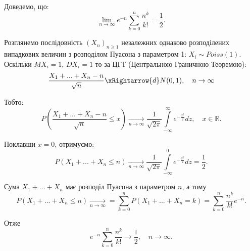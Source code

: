 \begin{example}
    Доведемо,  що:
    $$\lim\limits_{n \rightarrow \infty} e^{-n} \sum\limits_{k=0}^{n} \dfrac{n^k}{k!} = \dfrac{1}{2}.$$
    
    Розглянемо послідовність $(X_n)_{n \geqslant 1}$ незалежних
    однаково розподілених випадкових величин з розподілом Пуасона
    з параметром 1: $X_i \sim Poiss(1)$.
    Оскільки $MX_i = 1$, $DX_i = 1$ то за ЦГТ (Центральною Граничною
    Теоремою):
    $$\dfrac{X_1 + ... + X_n - n}{\sqrt{n}} \xRightarrow{d} N(0, 1), \quad n \rightarrow \infty$$
    
    Тобто:
    $$P\left(\dfrac{X_1 + ... + X_n - n}{\sqrt{n}} \leqslant x\right) \xrightarrow[n \rightarrow \infty]{}
    \dfrac{1}{\sqrt{2 \pi}} \int\limits_{-\infty}^{\infty} e^{-\frac{z^2}{2}} dz, \quad x \in \mathbb{R}.$$
    
    Поклавши $x = 0$, отримуємо:
    $$P\left(X_1 + ... + X_n \leqslant n\right) \xrightarrow[n \rightarrow \infty]{}
    \dfrac{1}{\sqrt{2 \pi}} \int\limits_{-\infty}^{0} e^{-\frac{z^2}{2}} dz = \dfrac{1}{2}.$$
    
    Сума $X_1 + ... + X_n$ має розподіл Пуасона з параметром $n$, а тому
    $$P\left(X_1 + ... + X_n \leqslant n\right) \xrightarrow[n \rightarrow \infty]{}
    = \sum\limits_{k=0}^{n} P\left(X_1 + ... + X_n = k\right)
    = \sum\limits_{k=0}^{n} \dfrac{n^k}{k!} e^{-n}.$$
    
    Отже
    $$e^{-n} \sum\limits_{k=0}^{n} \dfrac{n^k}{k!} \rightarrow \dfrac{1}{2}, \quad n \rightarrow \infty.$$
\end{example}


